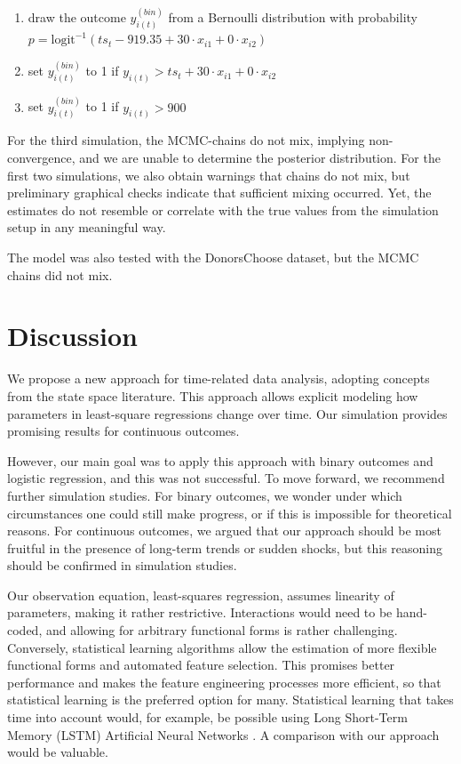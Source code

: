 \documentclass{article}
\begin{document}
\begin{enumerate}
    \item draw the outcome $y^{(bin)}_{i(t)}$ from a Bernoulli distribution with probability $p = \textrm{logit}^{-1}(ts_t - 919.35 + 30 \cdot x_{i1} + 0 \cdot x_{i2})$
    \item set $y^{(bin)}_{i(t)}$ to 1 if $y_{i(t)} > ts_t + 30 \cdot x_{i1} + 0 \cdot x_{i2}$
    \item set $y^{(bin)}_{i(t)}$ to 1 if $y_{i(t)} > 900$
\end{enumerate}

For the third simulation, the MCMC-chains do not mix, implying non-convergence, and we are unable to determine the posterior distribution. For the first two simulations, we also obtain warnings that chains do not mix, but preliminary graphical checks indicate that sufficient mixing occurred. Yet, the estimates do not resemble or correlate with the true values from the simulation setup in any meaningful way.

The model was also tested with the DonorsChoose dataset, but the MCMC chains did not mix.

\section{Discussion}\label{sec:discussion}

We propose a new approach for time-related data analysis, adopting concepts from the state space literature. This approach allows explicit modeling how parameters in least-square regressions change over time. Our simulation provides promising results for continuous outcomes. 

However, our main goal was to apply this approach with binary outcomes and logistic regression, and this was not successful. To move forward, we recommend further simulation studies. For binary outcomes, we wonder under which circumstances one could still make progress, or if this is impossible for theoretical reasons. For continuous outcomes, we argued that our approach should be most fruitful in the presence of long-term trends or sudden shocks, but this reasoning should be confirmed in simulation studies.

Our observation equation, least-squares regression, assumes linearity of parameters, making it rather restrictive. Interactions would need to be hand-coded, and allowing for arbitrary functional forms is rather challenging. Conversely, statistical learning algorithms allow the estimation of more flexible functional forms and automated feature selection. This promises better performance and makes the feature engineering processes more efficient, so that statistical learning is the preferred option for many. Statistical learning that takes time into account would, for example, be possible using Long Short-Term Memory (LSTM) Artificial Neural Networks \citep{hochreiter_long_1997}. A comparison with our approach would be valuable.
\end{document}
